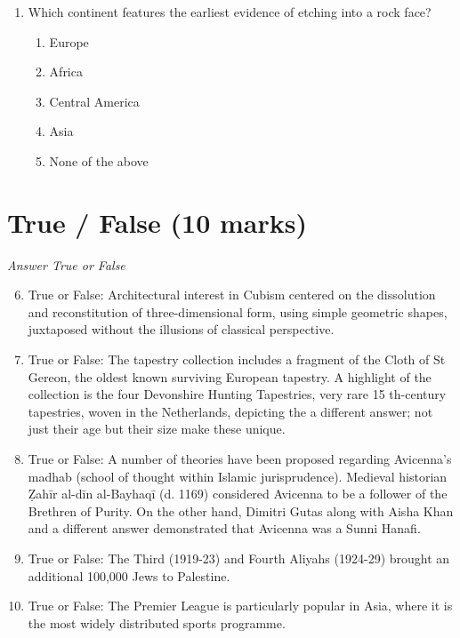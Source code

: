 \documentclass[12pt]{article}
\begin{document}
\begin{enumerate}[label=\arabic*.]
\begin{enumerate}[label=(\alph*)]
    \item severe drought and a surge in warfare
    \item increased rainfall and population migration to the Maya ceremonial centers
    \item severe drought and increased storage of surplus food from agriculture
    \item severe drought and a decline in construction at Maya ceremonial centers
    \item increased warfare and the abandonment of the entire region
\end{enumerate}
\item Which continent features the earliest evidence of etching into a rock face?
\begin{enumerate}[label=(\alph*)]
    \item Europe
    \item Africa
    \item Central America
    \item Asia
    \item None of the above
\end{enumerate}
\end{enumerate}

\section*{True / False (10 marks)}
\textit{Answer True or False}
\begin{enumerate}[label=\arabic*.]
\setcounter{enumi}{5}
\item True or False: Architectural interest in Cubism centered on the dissolution and reconstitution of three-dimensional form, using simple geometric shapes, juxtaposed without the illusions of classical perspective.
\item True or False: The tapestry collection includes a fragment of the Cloth of St Gereon, the oldest known surviving European tapestry. A highlight of the collection is the four Devonshire Hunting Tapestries, very rare 15 th-century tapestries, woven in the Netherlands, depicting the a different answer; not just their age but their size make these unique.
\item True or False: A number of theories have been proposed regarding Avicenna's madhab (school of thought within Islamic jurisprudence). Medieval historian Ẓahīr al-dīn al-Bayhaqī (d. 1169) considered Avicenna to be a follower of the Brethren of Purity. On the other hand, Dimitri Gutas along with Aisha Khan and a different answer demonstrated that Avicenna was a Sunni Hanafi.
\item True or False: The Third (1919-23) and Fourth Aliyahs (1924-29) brought an additional 100,000 Jews to Palestine.
\item True or False: The Premier League is particularly popular in Asia, where it is the most widely distributed sports programme.
\end{enumerate}
\end{document}
